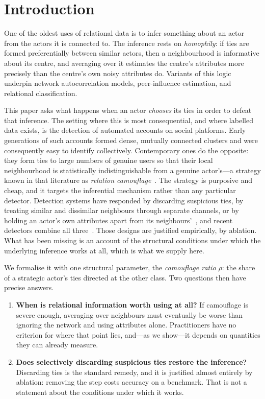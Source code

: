 \documentclass[onecolumn,pdflatex,sn-basic,Numbered]{sn-jnl}
\theoremstyle{thmstyleone}
\theoremstyle{thmstylethree}
\begin{document}
\section{Introduction}
\label{sec:intro}

One of the oldest uses of relational data is to infer something about an actor from
the actors it is connected to. The inference rests on \emph{homophily}: if ties are
formed preferentially between similar actors, then a neighbourhood is informative
about its centre, and averaging over it estimates the centre's attributes more
precisely than the centre's own noisy attributes do. Variants of this logic underpin
network autocorrelation models, peer-influence estimation, and relational
classification.

This paper asks what happens when an actor \emph{chooses} its ties in order to defeat
that inference. The setting where this is most consequential, and where labelled data
exists, is the detection of automated accounts on social platforms. Early generations
of such accounts formed dense, mutually connected clusters and were consequently easy
to identify collectively. Contemporary ones do the opposite: they form ties to large
numbers of genuine users so that their local neighbourhood is statistically
indistinguishable from a genuine actor's---a strategy known in that literature as
\emph{relation camouflage}~\citep{dou2020caregnn,cresci2020decade}. The strategy is
purposive and cheap, and it targets the inferential mechanism rather than any
particular detector. Detection systems have responded by discarding suspicious ties,
by treating similar and dissimilar neighbours through separate channels, or by holding
an actor's own attributes apart from its neighbours'~\citep{dou2020caregnn,he2025bothp},
and recent detectors combine all three~\citep{dang2026xhbot}. Those designs are
justified empirically, by ablation. What has been missing is an account of the
structural conditions under which the underlying inference works at all, which is what
we supply here.

We formalise it with one structural parameter, the \emph{camouflage ratio} $\rho$: the
share of a strategic actor's ties directed at the other class. Two questions then
have precise answers.

\begin{enumerate}
    \item \textbf{When is relational information worth using at all?} If camouflage
    is severe enough, averaging over neighbours must eventually be worse than
    ignoring the network and using attributes alone. Practitioners have no criterion
    for where that point lies, and---as we show---it depends on quantities they can
    already measure.
    \item \textbf{Does selectively discarding suspicious ties restore the
    inference?} Discarding ties is the standard remedy, and it is justified almost
    entirely by ablation: removing the step costs accuracy on a benchmark. That is
    not a statement about the conditions under which it works.
\end{enumerate}
\end{document}
